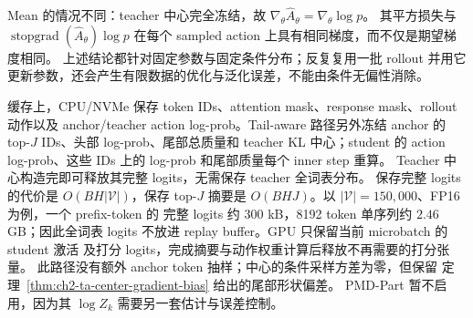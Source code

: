 Mean 的情况不同：teacher 中心完全冻结，故
$\nabla_\theta\widehat A_\theta=\nabla_\theta\log p$。
其平方损失与 $\operatorname{stopgrad}(\widehat A_\theta)\log p$
在每个 sampled action 上具有相同梯度，而不仅是期望梯度相同。
上述结论都针对固定参数与固定条件分布；反复复用一批 rollout 并用它
更新参数，还会产生有限数据的优化与泛化误差，不能由条件无偏性消除。

缓存上，CPU/NVMe 保存 token IDs、attention mask、response mask、rollout
动作以及 anchor/teacher action log-prob。Tail-aware 路径另外冻结 anchor
的 top-$J$ IDs、头部 log-prob、尾部总质量和 teacher KL 中心；student
的 action log-prob、这些 IDs 上的 log-prob 和尾部质量每个 inner step 重算。
Teacher 中心构造完即可释放其完整 logits，无需保存 teacher 全词表分布。
保存完整 logits 的代价是 $O(BH|\mathcal V|)$，保存 top-$J$ 摘要是
$O(BHJ)$。以 $|\mathcal V|=150{,}000$、FP16 为例，一个 prefix-token 的
完整 logits 约 $300$ kB，8192 token 单序列约 $2.46$ GB；因此全词表
logits 不放进 replay buffer。GPU 只保留当前 microbatch 的 student 激活
及打分 logits，完成摘要与动作权重计算后释放不再需要的打分张量。
此路径没有额外 anchor token 抽样；中心的条件采样方差为零，但保留
定理~\ref{thm:ch2-ta-center-gradient-bias} 给出的尾部形状偏差。
PMD-Part 暂不启用，因为其 $\log Z_k$ 需要另一套估计与误差控制。

